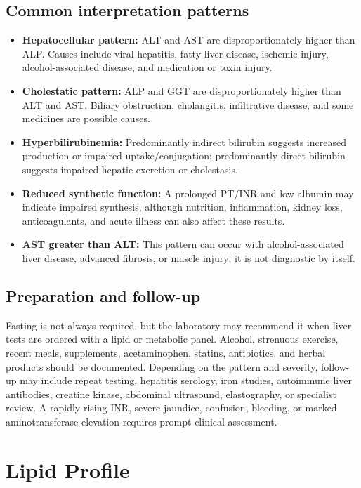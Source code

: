\documentclass[11pt,openany]{book}
\begin{document}
\subsection*{Common interpretation patterns}
\begin{itemize}[leftmargin=*]
  \item \textbf{Hepatocellular pattern:} ALT and AST are disproportionately higher than ALP. Causes include viral hepatitis, fatty liver disease, ischemic injury, alcohol-associated disease, and medication or toxin injury.
  \item \textbf{Cholestatic pattern:} ALP and GGT are disproportionately higher than ALT and AST. Biliary obstruction, cholangitis, infiltrative disease, and some medicines are possible causes.
  \item \textbf{Hyperbilirubinemia:} Predominantly indirect bilirubin suggests increased production or impaired uptake/conjugation; predominantly direct bilirubin suggests impaired hepatic excretion or cholestasis.
  \item \textbf{Reduced synthetic function:} A prolonged PT/INR and low albumin may indicate impaired synthesis, although nutrition, inflammation, kidney loss, anticoagulants, and acute illness can also affect these results.
  \item \textbf{AST greater than ALT:} This pattern can occur with alcohol-associated liver disease, advanced fibrosis, or muscle injury; it is not diagnostic by itself.
\end{itemize}

\subsection*{Preparation and follow-up}
Fasting is not always required, but the laboratory may recommend it when liver
tests are ordered with a lipid or metabolic panel. Alcohol, strenuous exercise,
recent meals, supplements, acetaminophen, statins, antibiotics, and herbal
products should be documented. Depending on the pattern and severity, follow-up
may include repeat testing, hepatitis serology, iron studies, autoimmune liver
antibodies, creatine kinase, abdominal ultrasound, elastography, or specialist
review. A rapidly rising INR, severe jaundice, confusion, bleeding, or marked
aminotransferase elevation requires prompt clinical assessment.

\section{Lipid Profile}
\end{document}

